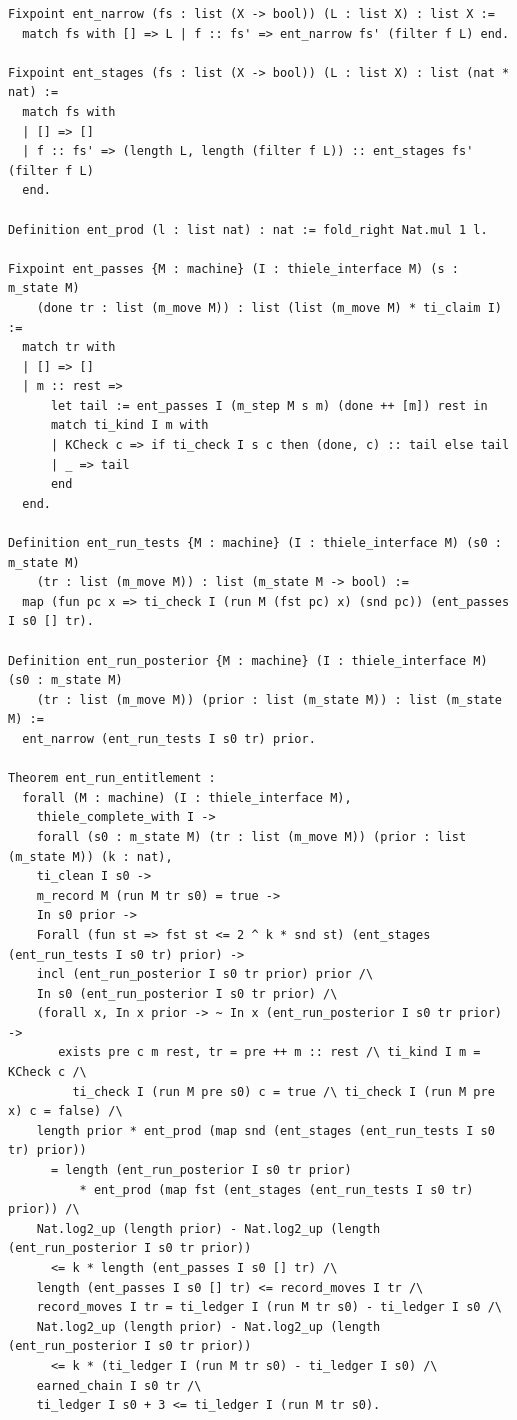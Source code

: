 {\tiny
\begin{verbatim}
Fixpoint ent_narrow (fs : list (X -> bool)) (L : list X) : list X :=
  match fs with [] => L | f :: fs' => ent_narrow fs' (filter f L) end.

Fixpoint ent_stages (fs : list (X -> bool)) (L : list X) : list (nat * nat) :=
  match fs with
  | [] => []
  | f :: fs' => (length L, length (filter f L)) :: ent_stages fs' (filter f L)
  end.

Definition ent_prod (l : list nat) : nat := fold_right Nat.mul 1 l.

Fixpoint ent_passes {M : machine} (I : thiele_interface M) (s : m_state M)
    (done tr : list (m_move M)) : list (list (m_move M) * ti_claim I) :=
  match tr with
  | [] => []
  | m :: rest =>
      let tail := ent_passes I (m_step M s m) (done ++ [m]) rest in
      match ti_kind I m with
      | KCheck c => if ti_check I s c then (done, c) :: tail else tail
      | _ => tail
      end
  end.

Definition ent_run_tests {M : machine} (I : thiele_interface M) (s0 : m_state M)
    (tr : list (m_move M)) : list (m_state M -> bool) :=
  map (fun pc x => ti_check I (run M (fst pc) x) (snd pc)) (ent_passes I s0 [] tr).

Definition ent_run_posterior {M : machine} (I : thiele_interface M) (s0 : m_state M)
    (tr : list (m_move M)) (prior : list (m_state M)) : list (m_state M) :=
  ent_narrow (ent_run_tests I s0 tr) prior.

Theorem ent_run_entitlement :
  forall (M : machine) (I : thiele_interface M),
    thiele_complete_with I ->
    forall (s0 : m_state M) (tr : list (m_move M)) (prior : list (m_state M)) (k : nat),
    ti_clean I s0 ->
    m_record M (run M tr s0) = true ->
    In s0 prior ->
    Forall (fun st => fst st <= 2 ^ k * snd st) (ent_stages (ent_run_tests I s0 tr) prior) ->
    incl (ent_run_posterior I s0 tr prior) prior /\
    In s0 (ent_run_posterior I s0 tr prior) /\
    (forall x, In x prior -> ~ In x (ent_run_posterior I s0 tr prior) ->
       exists pre c m rest, tr = pre ++ m :: rest /\ ti_kind I m = KCheck c /\
         ti_check I (run M pre s0) c = true /\ ti_check I (run M pre x) c = false) /\
    length prior * ent_prod (map snd (ent_stages (ent_run_tests I s0 tr) prior))
      = length (ent_run_posterior I s0 tr prior)
          * ent_prod (map fst (ent_stages (ent_run_tests I s0 tr) prior)) /\
    Nat.log2_up (length prior) - Nat.log2_up (length (ent_run_posterior I s0 tr prior))
      <= k * length (ent_passes I s0 [] tr) /\
    length (ent_passes I s0 [] tr) <= record_moves I tr /\
    record_moves I tr = ti_ledger I (run M tr s0) - ti_ledger I s0 /\
    Nat.log2_up (length prior) - Nat.log2_up (length (ent_run_posterior I s0 tr prior))
      <= k * (ti_ledger I (run M tr s0) - ti_ledger I s0) /\
    earned_chain I s0 tr /\
    ti_ledger I s0 + 3 <= ti_ledger I (run M tr s0).
\end{verbatim}}

